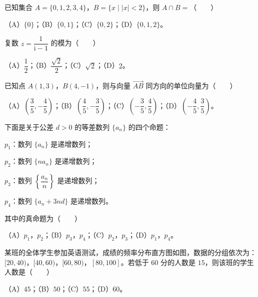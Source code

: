 

\begin{question}
已知集合 $A=\{0,1,2,3,4\}$，$B=\{x\mid |x|<2\}$，则 $A\cap B=$\mbox{（　　）}

（A）$\{0\}$；（B）$\{0,1\}$；（C）$\{0,2\}$；（D）$\{0,1,2\}$。

\end{question}
\begin{question}
复数 $z=\dfrac{1}{\mathrm i-1}$ 的模为\mbox{（　　）}

（A）$\dfrac12$；（B）$\dfrac{\sqrt2}2$；（C）$\sqrt2$；（D）$2$。

\end{question}
\begin{question}
已知点 $A(1,3)$，$B(4,-1)$，则与向量 $\overrightarrow{AB}$ 同方向的单位向量为\mbox{（　　）}

（A）$\left(\dfrac35,-\dfrac45\right)$；（B）$\left(\dfrac45,-\dfrac35\right)$；（C）$\left(-\dfrac35,\dfrac45\right)$；（D）$\left(-\dfrac45,\dfrac35\right)$。

\end{question}
\begin{question}
下面是关于公差 $d>0$ 的等差数列 $\{a_n\}$ 的四个命题：

$p_1$：数列 $\{a_n\}$ 是递增数列；

$p_2$：数列 $\{na_n\}$ 是递增数列；

$p_3$：数列 $\left\{\dfrac{a_n}{n}\right\}$ 是递增数列；

$p_4$：数列 $\{a_n+3nd\}$ 是递增数列。

其中的真命题为\mbox{（　　）}

（A）$p_1$，$p_2$；（B）$p_3$，$p_4$；（C）$p_2$，$p_3$；（D）$p_1$，$p_4$。

\Needspace{0.4\textheight}
\end{question}
\begin{question}
某班的全体学生参加英语测试，成绩的频率分布直方图如图，数据的分组依次为：$[20,40)$，$[40,60)$，$[60,80)$，$[80,100]$。若低于 $60$ 分的人数是 $15$，则该班的学生人数是\mbox{（　　）}
\nopagebreak[4]
\begin{center}\end{center}
\nopagebreak[4]
（A）$45$；（B）$50$；（C）$55$；（D）$60$。

\end{question}
